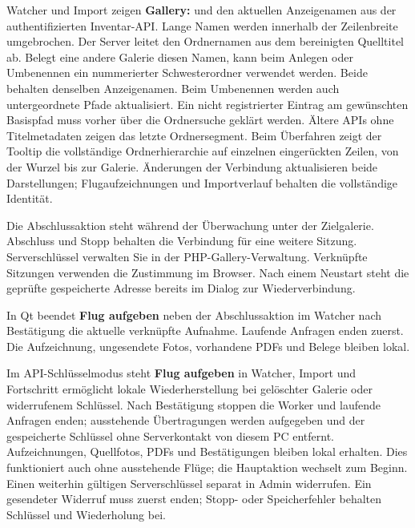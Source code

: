 \documentclass[11pt,a4paper]{article}
\newcommand{\ui}[1]{\textbf{#1}}
\begin{document}
Watcher und Import zeigen \ui{Gallery:} und den aktuellen Anzeigenamen aus
der authentifizierten Inventar-API. Lange Namen werden innerhalb der
Zeilenbreite umgebrochen. Der Server leitet den Ordnernamen aus dem bereinigten
Quelltitel ab. Belegt eine andere Galerie diesen Namen, kann beim Anlegen oder
Umbenennen ein nummerierter Schwesterordner verwendet werden. Beide behalten
denselben Anzeigenamen. Beim Umbenennen werden auch untergeordnete Pfade
aktualisiert. Ein nicht registrierter Eintrag am gewünschten Basispfad muss
vorher über die Ordnersuche geklärt werden. Ältere APIs ohne Titelmetadaten
zeigen das letzte Ordnersegment.
Beim Überfahren zeigt der Tooltip die vollständige Ordnerhierarchie auf
einzelnen eingerückten Zeilen, von der Wurzel bis zur Galerie. Änderungen der
Verbindung aktualisieren beide Darstellungen; Flugaufzeichnungen und
Importverlauf behalten die vollständige Identität.

Die Abschlussaktion steht während der Überwachung unter der Zielgalerie.
Abschluss und Stopp behalten die Verbindung für eine weitere Sitzung.
Serverschlüssel verwalten Sie in der PHP-Gallery-Verwaltung. Verknüpfte
Sitzungen verwenden die Zustimmung im Browser. Nach einem Neustart steht
die geprüfte gespeicherte Adresse bereits im Dialog zur Wiederverbindung.

In Qt beendet \ui{Flug aufgeben} neben der Abschlussaktion im Watcher nach
Bestätigung die aktuelle verknüpfte Aufnahme. Laufende Anfragen enden zuerst.
Die Aufzeichnung, ungesendete Fotos, vorhandene PDFs und Belege bleiben lokal.

Im API-Schlüsselmodus steht \ui{Flug aufgeben} in Watcher, Import und Fortschritt
ermöglicht lokale Wiederherstellung bei gelöschter Galerie oder widerrufenem
Schlüssel. Nach Bestätigung stoppen die Worker und laufende Anfragen enden;
ausstehende Übertragungen werden aufgegeben und der gespeicherte Schlüssel
ohne Serverkontakt von diesem PC entfernt. Aufzeichnungen, Quellfotos, PDFs und
Bestätigungen bleiben lokal erhalten. Dies funktioniert auch ohne ausstehende
Flüge; die Hauptaktion wechselt zum Beginn. Einen weiterhin gültigen
Serverschlüssel separat in Admin widerrufen. Ein gesendeter Widerruf muss zuerst
enden; Stopp- oder Speicherfehler behalten Schlüssel und Wiederholung bei.
\end{document}
